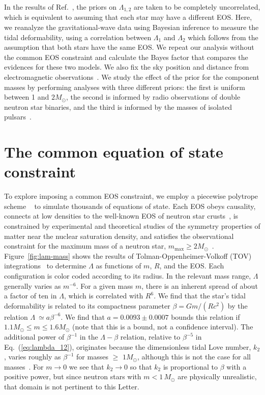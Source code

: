 In the results of Ref.~\cite{TheLIGOScientific:2017qsa},
the priors on $\Lambda_{1,2}$ are taken to be completely uncorrelated,
which is equivalent to assuming that each star may have a different
EOS. Here, we reanalyze the gravitational-wave data using Bayesian
inference \cite{Biwer:2018osg,alex_nitz_2018_1208115,emcee} to measure the tidal deformability, using a
correlation between $\Lambda_1$ and $\Lambda_2$ which follows from the
assumption that both stars have the same EOS.  We repeat
our analysis without the common EOS constraint and calculate the 
Bayes factor that compares the evidences for these two models.
We also fix the sky position and
distance from electromagnetic observations~\cite{Soares-Santos:2017lru,Cantiello:2018ffy}.
We study the effect of
the prior for the component masses by performing analyses with three
different priors: the first is uniform between 1 and $2M_\odot$, the
second is informed by radio observations of double neutron star
binaries, and the third is informed by the masses of isolated pulsars~\cite{Ozel:2016oaf}.

\section{The common equation of state constraint}

To explore imposing a common EOS constraint, we employ a piecewise polytrope scheme ~\cite{Lattimer:2015nhk} to simulate thousands of equations of state.  Each EOS obeys causality, connects at low densities to the well-known EOS of neutron star crusts~\cite{Lattimer:2012nd}, is constrained by experimental and theoretical studies of the symmetry properties of matter near the nuclear saturation density, and satisfies the observational constraint for the maximum mass of a neutron star, $m_\mathrm{max}\ge2M_\odot$~\cite{Antoniadis:2013pzd}. Figure~\ref{fig:lam-mass} shows the results of Tolman-Oppenheimer-Volkoff (TOV) integrations~\cite{Oppenheimer:1939ne,Postnikov:2010yn} to determine $\Lambda$ as functions of $m$, $R$, and the EOS. Each configuration is color coded according to its
radius. In the relevant mass range, $\Lambda$ generally varies as
$m^{-6}$. For a given mass $m$, there is an inherent spread of about a factor of ten in $\Lambda$, which is correlated with $R^6$. We find that the star's tidal deformability is related to its compactness parameter 
$\beta=Gm/(Rc^2)$ by the relation $\Lambda~\simeq a\beta^{-6}$. We find that $a=0.0093\pm0.0007$ bounds this relation if $1.1M_\odot\le m\le1.6M_\odot$
(note that this is a bound, not a confidence interval). The additional power of $\beta^{-1}$ in the $\Lambda-\beta$ relation, relative to $\beta^{-5}$ in Eq.~(\ref{eq:lambda_12}), originates because the dimensionless tidal Love number, $k_2$, varies roughly as $\beta^{-1}$ for masses $\geq$
$1M_\odot$, although this is not the case for all masses~\cite{Postnikov:2010yn}. For $m\to0$ we see that $k_2\to0$ so that $k_2$ is proportional to $\beta$ with a positive power, but since neutron stars with $m < 1\,M_\odot$ are physically unrealistic, that domain is not pertinent to this Letter.

